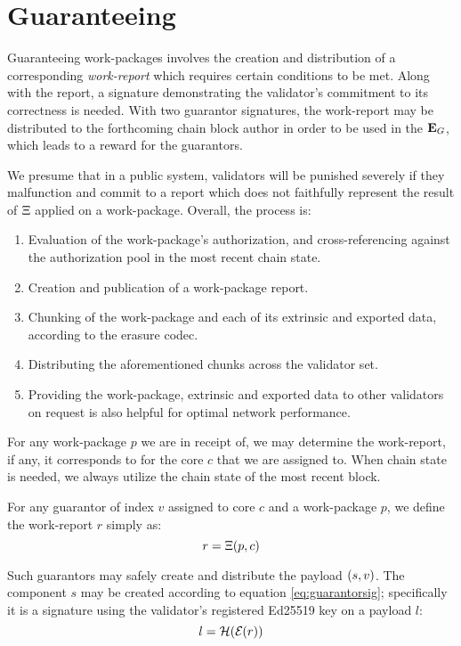 \section{Guaranteeing}\label{sec:guaranteeing}

Guaranteeing work-packages involves the creation and distribution of a corresponding \emph{work-report} which requires certain conditions to be met. Along with the report, a signature demonstrating the validator's commitment to its correctness is needed. With two guarantor signatures, the work-report may be distributed to the forthcoming \Jam chain block author in order to be used in the $\mathbf{E}_G$, which leads to a reward for the guarantors.

We presume that in a public system, validators will be punished severely if they malfunction and commit to a report which does not faithfully represent the result of $\Xi$ applied on a work-package. Overall, the process is:

\begin{enumerate}
    \item Evaluation of the work-package's authorization, and cross-referencing against the authorization pool in the most recent \Jam chain state.
    \item Creation and publication of a work-package report.
    \item Chunking of the work-package and each of its extrinsic and exported data, according to the erasure codec.
    \item Distributing the aforementioned chunks across the validator set.
    \item Providing the work-package, extrinsic and exported data to other validators on request is also helpful for optimal network performance.
\end{enumerate}

For any work-package $p$ we are in receipt of, we may determine the work-report, if any, it corresponds to for the core $c$ that we are assigned to. When \Jam chain state is needed, we always utilize the chain state of the most recent block.

For any guarantor of index $v$ assigned to core $c$ and a work-package $p$, we define the work-report $r$ simply as:
\begin{equation}
  r = \Xi(p, c)
\end{equation}

Such guarantors may safely create and distribute the payload $\tup{s, v}$. The component $s$ may be created according to equation \ref{eq:guarantorsig}; specifically it is a signature using the validator's registered Ed25519 key on a payload $l$:
\begin{equation}
  l = \blake{\encode{r}}
\end{equation}

